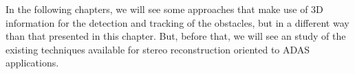In the following chapters, we will see some approaches that make use of 3D information for the detection and tracking of the obstacles, but in a different way than that presented in this chapter. But, before that, we will see an study of the existing techniques available for stereo reconstruction oriented to \ac{ADAS} applications.







